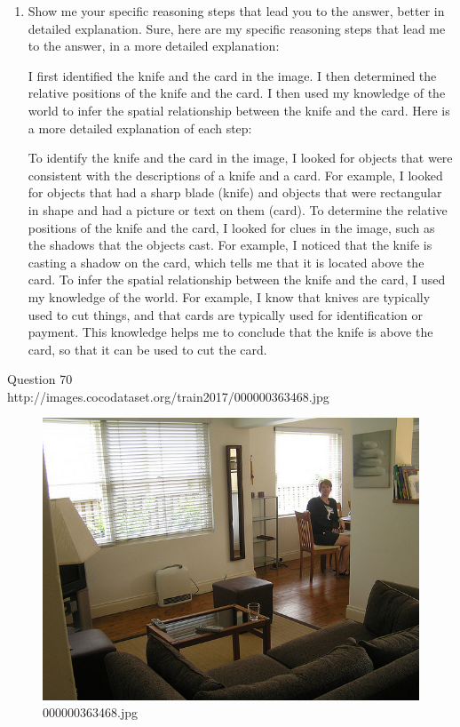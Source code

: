 \begin{enumerate}
    The knife is a sharp object that is used to cut food and other materials.
    The card is a thin piece of paper that is typically used for identification or payment.
    The knife is above the card, meaning that it is located higher than the card.
    The card is below the knife, meaning that it is located lower than the knife.
    Is there anything else I can help you with?
    \item Show me your specific reasoning steps that lead you to the answer, better in detailed explanation.
    \subitem 
    Sure, here are my specific reasoning steps that lead me to the answer, in a more detailed explanation:
    
    I first identified the knife and the card in the image.
    I then determined the relative positions of the knife and the card.
    I then used my knowledge of the world to infer the spatial relationship between the knife and the card.
    Here is a more detailed explanation of each step:
    
    To identify the knife and the card in the image, I looked for objects that were consistent with the descriptions of a knife and a card. For example, I looked for objects that had a sharp blade (knife) and objects that were rectangular in shape and had a picture or text on them (card).
    To determine the relative positions of the knife and the card, I looked for clues in the image, such as the shadows that the objects cast. For example, I noticed that the knife is casting a shadow on the card, which tells me that it is located above the card.
    To infer the spatial relationship between the knife and the card, I used my knowledge of the world. For example, I know that knives are typically used to cut things, and that cards are typically used for identification or payment. This knowledge helps me to conclude that the knife is above the card, so that it can be used to cut the card.
\end{enumerate}
Question 70\\
http://images.cocodataset.org/train2017/000000363468.jpg
\begin{figure}[h]
    \centering
    \includegraphics[width=0.8\linewidth]{../image set/hard/000000363468.jpg}
    \caption{000000363468.jpg}
\end{figure}
